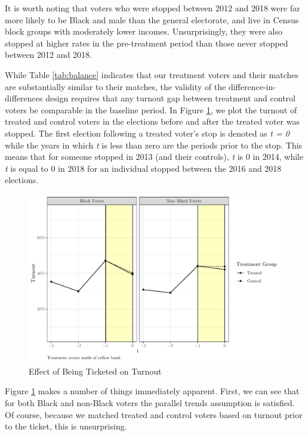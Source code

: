 \documentclass[
  12pt,
]{article}
\begin{document}
It is worth noting that voters who were stopped between 2012 and 2018 were far more likely to be Black and male than the general electorate, and live in Census block groups with moderately lower incomes. Unsurprisingly, they were also stopped at higher rates in the pre-treatment period than those never stopped between 2012 and 2018.

While Table \ref{tab:balance} indicates that our treatment voters and their matches are substantially similar to their matches, the validity of the difference-in-differences design requires that any turnout gap between treatment and control voters be comparable in the baseline period. In Figure \ref{fig:did1}, we plot the turnout of treated and control voters in the elections before and after the treated voter was stopped. The first election following a treated voter's stop is denoted as \emph{t = 0} while the years in which \emph{t} is less than zero are the periods prior to the stop. This means that for someone stopped in 2013 (and their controls), \emph{t} is 0 in 2014, while \emph{t} is equal to 0 in 2018 for an individual stopped between the 2016 and 2018 elections.

\begin{figure}[H]

{\centering \includegraphics{draft_paper_files/figure-latex/did1-1} 

}

\caption{\label{fig:did-1}Effect of Being Ticketed on Turnout}\label{fig:did1}
\end{figure}

Figure \ref{fig:did1} makes a number of things immediately apparent. First, we can see that for both Black and non-Black voters the parallel trends assumption is satisfied. Of course, because we matched treated and control voters based on turnout prior to the ticket, this is unsurprising.
\end{document}
